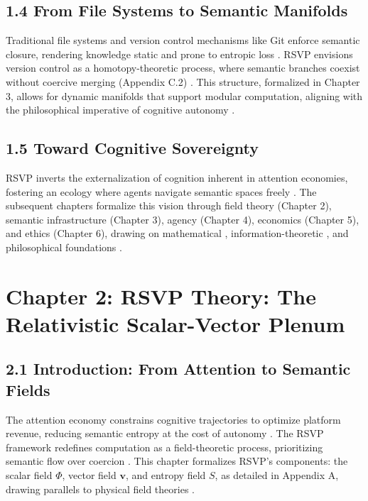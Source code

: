 \documentclass[12pt]{article}
\begin{document}
\subsection{1.4 From File Systems to Semantic Manifolds}

Traditional file systems and version control mechanisms like Git enforce semantic closure, rendering knowledge static and prone to entropic loss \citep{bird1988}. RSVP envisions version control as a homotopy-theoretic process, where semantic branches coexist without coercive merging (Appendix C.2) \citep{hatcher2002}. This structure, formalized in Chapter 3, allows for dynamic manifolds that support modular computation, aligning with the philosophical imperative of cognitive autonomy \citep{ortega1957, whitehead1978}.

\subsection{1.5 Toward Cognitive Sovereignty}

RSVP inverts the externalization of cognition inherent in attention economies, fostering an ecology where agents navigate semantic spaces freely \citep{deleuze1987}. The subsequent chapters formalize this vision through field theory (Chapter 2), semantic infrastructure (Chapter 3), agency (Chapter 4), economics (Chapter 5), and ethics (Chapter 6), drawing on mathematical \citep{atiyah1969, gromov1999}, information-theoretic \citep{cover2006}, and philosophical foundations \citep{whitehead1978}.

\section{Chapter 2: RSVP Theory: The Relativistic Scalar-Vector Plenum}

\subsection{2.1 Introduction: From Attention to Semantic Fields}

The attention economy constrains cognitive trajectories to optimize platform revenue, reducing semantic entropy at the cost of autonomy \citep{zuboff2019, lanier2018}. The RSVP framework redefines computation as a field-theoretic process, prioritizing semantic flow over coercion \citep{gromov1999}. This chapter formalizes RSVP’s components: the scalar field \(\Phi\), vector field \(\mathbf{v}\), and entropy field \(S\), as detailed in Appendix A, drawing parallels to physical field theories \citep{baez2011}.
\end{document}
